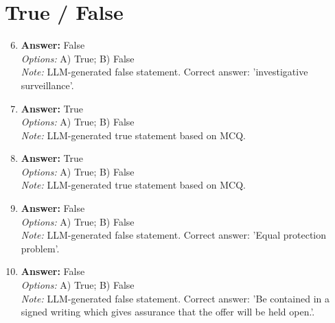 \documentclass[12pt]{article}
\begin{document}
\section*{True / False}
\begin{enumerate}[label=\arabic*.]
\setcounter{enumi}{5}
\item \textbf{Answer:} False
\\ \textit{Options:} A) True; B) False
\\ \textit{Note:} LLM-generated false statement. Correct answer: 'investigative surveillance'.
\item \textbf{Answer:} True
\\ \textit{Options:} A) True; B) False
\\ \textit{Note:} LLM-generated true statement based on MCQ.
\item \textbf{Answer:} True
\\ \textit{Options:} A) True; B) False
\\ \textit{Note:} LLM-generated true statement based on MCQ.
\item \textbf{Answer:} False
\\ \textit{Options:} A) True; B) False
\\ \textit{Note:} LLM-generated false statement. Correct answer: 'Equal protection problem'.
\item \textbf{Answer:} False
\\ \textit{Options:} A) True; B) False
\\ \textit{Note:} LLM-generated false statement. Correct answer: 'Be contained in a signed writing which gives assurance that the offer will be held open.'.
\end{enumerate}
\end{document}
